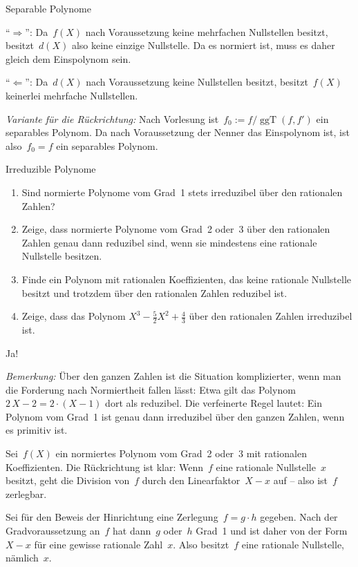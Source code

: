 \documentclass{algblatt}
\begin{document}
\begin{aufgabe}{Separable Polynome}
\begin{loesungE}
"`$\Longrightarrow$"': Da~$f(X)$ nach Voraussetzung keine mehrfachen
Nullstellen besitzt, besitzt~$d(X)$ also keine einzige Nullstelle. Da es
normiert ist, muss es daher gleich dem Einspolynom sein.

"`$\Longleftarrow$"': Da~$d(X)$ nach Voraussetzung keine Nullstellen besitzt,
besitzt~$f(X)$ keinerlei mehrfache Nullstellen.

\emph{Variante für die Rückrichtung:} Nach Vorlesung ist~$f_0 := f /
\operatorname{ggT}(f, f')$ ein separables Polynom. Da nach Voraussetzung der
Nenner das Einspolynom ist, ist also~$f_0 = f$ ein separables Polynom.
\end{loesungE}
\end{aufgabe}

\ifloesungen\newpage\fi
\begin{aufgabe}{Irreduzible Polynome}
\begin{enumerate}
\item Sind normierte Polynome vom Grad~1 stets irreduzibel über den rationalen
Zahlen?
\item Zeige, dass normierte Polynome vom Grad~2 oder~3 über den rationalen
Zahlen genau dann reduzibel sind, wenn sie mindestens eine rationale Nullstelle
besitzen.
\item Finde ein Polynom mit rationalen Koeffizienten, das keine rationale
Nullstelle besitzt und trotzdem über den rationalen Zahlen reduzibel ist.
\item Zeige, dass das Polynom $X^3 - \frac{5}{2}X^2 + \frac{4}{3}$ über den
rationalen Zahlen irreduzibel ist.
\end{enumerate}

\begin{loesungE}
\item Ja!

\emph{Bemerkung:} Über den ganzen Zahlen ist die Situation komplizierter, wenn
man die Forderung nach Normiertheit fallen lässt: Etwa
gilt das Polynom~$2\,X - 2 = 2 \cdot (X - 1)$ dort als reduzibel. Die
verfeinerte Regel lautet: Ein Polynom vom Grad~1 ist genau dann irreduzibel
über den ganzen Zahlen, wenn es primitiv ist.

\item Sei~$f(X)$ ein normiertes Polynom vom Grad~2 oder~3 mit rationalen
Koeffizienten. Die Rückrichtung ist klar: Wenn~$f$ eine rationale
Nullstelle~$x$ besitzt, geht die Division von~$f$ durch den Linearfaktor~$X-x$
auf -- also ist~$f$ zerlegbar.

Sei für den Beweis der Hinrichtung eine Zerlegung~$f = g \cdot h$ gegeben. Nach
der Gradvoraussetzung an~$f$ hat dann~$g$ oder~$h$ Grad~1 und ist daher von der
Form~$X-x$ für eine gewisse rationale Zahl~$x$. Also besitzt~$f$ eine rationale
Nullstelle, nämlich~$x$.


\end{loesungE}
\end{aufgabe}
\end{document}
